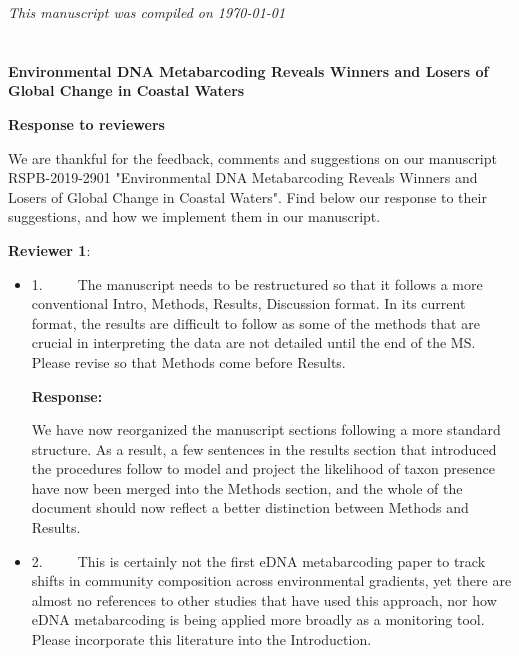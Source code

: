 \documentclass[11pt]{article}
\begin{document}
\begin{linenumbers}
       
   
\textit{\tiny	This manuscript was compiled on \today }	
\section*{}

\textbf{ 
 Environmental DNA Metabarcoding Reveals Winners and Losers of Global Change in Coastal Waters} 
  
\textbf {Response to reviewers}


\vspace*{1em}

We are thankful for the feedback, comments and suggestions on our manuscript RSPB-2019-2901  "Environmental DNA Metabarcoding Reveals Winners and Losers of Global Change in Coastal Waters". Find below our response to their suggestions, and how we implement them in our manuscript.

\vspace*{1em}
\textbf{\large{ Reviewer 1}}: 

\begin{itemize}

\item{1.      The manuscript needs to be restructured so that it follows a more conventional Intro, Methods, Results, Discussion format. In its current format, the results are difficult to follow as some of the methods that are crucial in interpreting the data are not detailed until the end of the MS. Please revise so that Methods come before Results. }

\textbf{Response:}

We have now reorganized the manuscript sections following a more standard structure. As a result, a few sentences in the results section that introduced the procedures follow to model and project the likelihood of taxon presence have now been merged into the Methods section, and the whole of the document should now reflect a better distinction between Methods and Results. 


\item{2.      This is certainly not the first eDNA metabarcoding paper to track shifts in community composition across environmental gradients, yet there are almost no references to other studies that have used this approach, nor how eDNA metabarcoding is being applied more broadly as a monitoring tool. Please incorporate this literature into the Introduction. }


\end{itemize}
\end{linenumbers}
\end{document}
